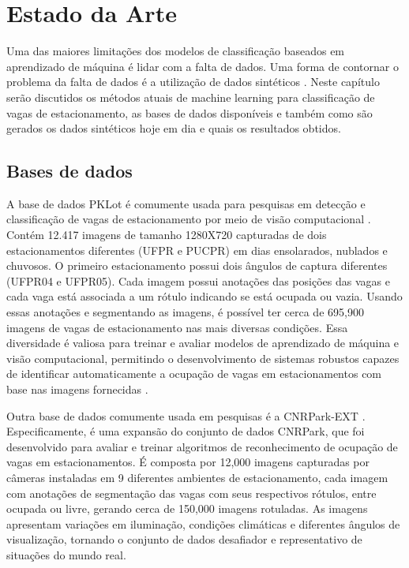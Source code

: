 \chapter{Estado da Arte}


Uma das maiores limitações dos modelos de classificação baseados em aprendizado de máquina é lidar com a falta de dados. Uma forma de contornar o problema da falta de dados é a utilização de dados sintéticos \citep{synthetic-pedestrians} \citep{domain-random}. Neste capítulo serão discutidos os métodos atuais de machine learning para classificação de vagas de estacionamento, as bases de dados disponíveis e também como são gerados os dados sintéticos hoje em dia e quais os resultados obtidos.

\section{Bases de dados}

A base de dados PKLot \citep{pklot2} é comumente usada para pesquisas em detecção e classificação de vagas de estacionamento por meio de visão computacional \citep{heat-map}\citep{hochuli-2}\citep{systematic-review}. Contém 12.417 imagens de tamanho 1280X720 capturadas de dois estacionamentos diferentes (UFPR e PUCPR) em dias ensolarados, nublados e chuvosos. O primeiro estacionamento possui dois ângulos de captura diferentes (UFPR04 e UFPR05). Cada imagem possui anotações das posições das vagas e cada vaga está associada a um rótulo indicando se está ocupada ou vazia. Usando essas anotações e segmentando as imagens, é possível ter cerca de 695,900 imagens de vagas de estacionamento nas mais diversas condições. Essa diversidade é valiosa para treinar e avaliar modelos de aprendizado de máquina e visão computacional, permitindo o desenvolvimento de sistemas robustos capazes de identificar automaticamente a ocupação de vagas em estacionamentos com base nas imagens fornecidas \citep{pklot2}\citep{systematic-review}\citep{hochuli-2}.

Outra base de dados comumente usada em pesquisas é a CNRPark-EXT \citet{cnrpark}. Especificamente, é uma expansão do conjunto de dados CNRPark, que foi desenvolvido para avaliar e treinar algoritmos de reconhecimento de ocupação de vagas em estacionamentos. É composta por 12,000 imagens capturadas por câmeras instaladas em 9 diferentes ambientes de estacionamento, cada imagem com anotações de segmentação das vagas com seus respectivos rótulos, entre ocupada ou livre, gerando cerca de 150,000 imagens rotuladas. As imagens apresentam variações em iluminação, condições climáticas e diferentes ângulos de visualização, tornando o conjunto de dados desafiador e representativo de situações do mundo real.

